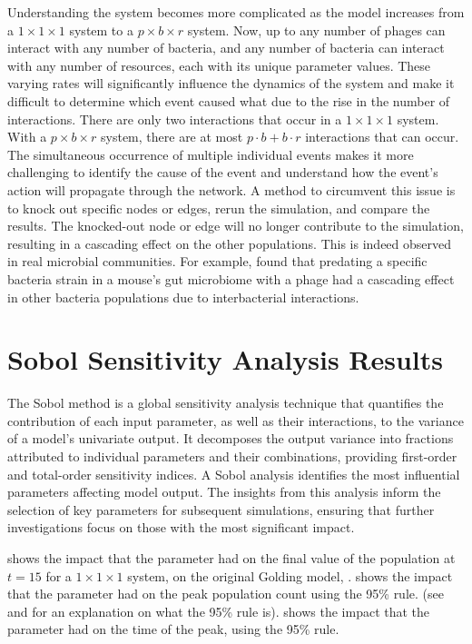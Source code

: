 Understanding the system becomes more complicated as the model increases from a $1\times1\times1$ system to a $p\times b\times r$ system. 
Now, up to any number of phages can interact with any number of bacteria, and any number of bacteria can interact with any number of resources, each with its unique parameter values. 
These varying rates will significantly influence the dynamics of the system and make it difficult to determine which event caused what due to the rise in the number of interactions.
There are only two interactions that occur in a $1\times1\times1$ system. 
With a $p\times b\times r$ system, there are at most $p\cdot b + b\cdot r$ interactions that can occur. 
The simultaneous occurrence of multiple individual events makes it more challenging to identify the cause of the event and understand how the event's action will propagate through the network. 
A method to circumvent this issue is to knock out specific nodes or edges, rerun the simulation, and compare the results. 
The knocked-out node or edge will no longer contribute to the simulation, resulting in a cascading effect on the other populations. 
This is indeed observed in real microbial communities. 
For example, \citet{hsuDynamicModulationGut2019} found that predating a specific bacteria strain in a mouse's gut microbiome with a phage had a cascading effect in other bacteria populations due to interbacterial interactions. 

\section{Sobol Sensitivity Analysis Results}
\label{sec:Sobol_sensitivity_analysis_results}
The Sobol method is a global sensitivity analysis technique that quantifies the contribution of each input parameter, as well as their interactions, to the variance of a model's univariate output. 
It decomposes the output variance into fractions attributed to individual parameters and their combinations, providing first-order and total-order sensitivity indices.
A Sobol analysis identifies the most influential parameters affecting model output. 
The insights from this analysis inform the selection of key parameters for subsequent simulations, ensuring that further investigations focus on those with the most significant impact.

 shows the impact that the parameter had on the final value of the population at $t=15$ for a $1\times 1\times 1$ system, on the original Golding model, . 
 shows the impact that the parameter had on the peak population count using the 95\% rule. 
(see  and  for an explanation on what the 95\% rule is). 
 shows the impact that the parameter had on the time of the peak, using the 95\% rule. 

